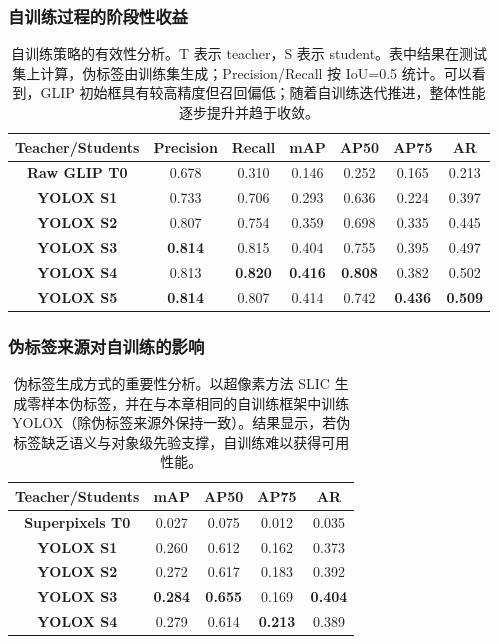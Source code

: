 \subsubsection{自训练过程的阶段性收益}
\begin{table}[htbp]
  \centering
  \renewcommand{\arraystretch}{1.1}
  \caption{自训练策略的有效性分析。T 表示 teacher，S 表示 student。表中结果在测试集上计算，伪标签由训练集生成；Precision/Recall 按 IoU=0.5 统计。可以看到，GLIP 初始框具有较高精度但召回偏低；随着自训练迭代推进，整体性能逐步提升并趋于收敛。}
  \label{tab:zeroshot_selftrain_stage}
  \begin{tabular}{c|cccccc}
    \hline
    \textbf{Teacher/Students} & \textbf{Precision} & \textbf{Recall} & \textbf{mAP} & \textbf{AP50} & \textbf{AP75} & \textbf{AR} \\ \hline
    \textbf{Raw GLIP T0} & 0.678 & 0.310 & 0.146 & 0.252 & 0.165 & 0.213 \\
    \textbf{YOLOX S1}    & 0.733 & 0.706 & 0.293 & 0.636 & 0.224 & 0.397 \\
    \textbf{YOLOX S2}    & 0.807 & 0.754 & 0.359 & 0.698 & 0.335 & 0.445 \\
    \textbf{YOLOX S3}    & \textbf{0.814} & 0.815 & 0.404 & 0.755 & 0.395 & 0.497 \\
    \textbf{YOLOX S4}    & 0.813 & \textbf{0.820} & \textbf{0.416} & \textbf{0.808} & 0.382 & 0.502 \\
    \textbf{YOLOX S5}    & \textbf{0.814} & 0.807 & 0.414 & 0.742 & \textbf{0.436} & \textbf{0.509} \\ \hline
  \end{tabular}
\end{table}

\subsubsection{伪标签来源对自训练的影响}
\begin{table}[htbp]
  \centering
  \renewcommand{\arraystretch}{1.1}
  \caption{伪标签生成方式的重要性分析。以超像素方法 SLIC \cite{achanta2012slic} 生成零样本伪标签，并在与本章相同的自训练框架中训练 YOLOX（除伪标签来源外保持一致）。结果显示，若伪标签缺乏语义与对象级先验支撑，自训练难以获得可用性能。}
  \label{tab:zeroshot_superpixel}
  \begin{tabular}{c|cccc}
    \hline
    \textbf{Teacher/Students} & \textbf{mAP} & \textbf{AP50} & \textbf{AP75} & \textbf{AR} \\ \hline
    \textbf{Superpixels T0} & 0.027 & 0.075 & 0.012 & 0.035 \\
    \textbf{YOLOX S1}       & 0.260 & 0.612 & 0.162 & 0.373 \\
    \textbf{YOLOX S2}       & 0.272 & 0.617 & 0.183 & 0.392 \\
    \textbf{YOLOX S3}       & \textbf{0.284} & \textbf{0.655} & 0.169 & \textbf{0.404} \\
    \textbf{YOLOX S4}       & 0.279 & 0.614 & \textbf{0.213} & 0.389 \\ \hline
  \end{tabular}
\end{table}

